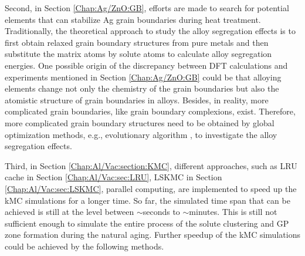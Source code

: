 Second, in Section \ref{Chap:Ag/ZnO:GB}, efforts are made to search for potential elements that can stabilize Ag grain boundaries during heat treatment. Traditionally, the theoretical approach to study the alloy segregation effects is to first obtain relaxed grain boundary structures from pure metals and then substitute the matrix atoms by solute atoms to calculate alloy segregation energies. One possible origin of the discrepancy between DFT calculations and experiments mentioned in Section \ref{Chap:Ag/ZnO:GB} could be that alloying elements change not only the chemistry of the grain boundaries but also the atomistic structure of grain boundaries in alloys. Besides, in reality, more complicated grain boundaries, like grain boundary complexions, exist\cite{cantwell2014grain}. Therefore, more complicated grain boundary structures need to be obtained by global optimization methods, e.g., evolutionary algorithm \cite{yang2020grain}, to investigate the alloy segregation effects.

Third, in Section \ref{Chap:Al/Vac:section:KMC}, different approaches, such as \ac{LRU} cache in Section \ref{Chap:Al/Vac:sec:LRU}, \ac{LSKMC} in Section \ref{Chap:Al/Vac:sec:LSKMC}, parallel computing, are implemented to speed up the \ac{kMC} simulations for a longer time. So far, the simulated time span that can be achieved is still at the level between $\sim$seconds to $\sim$minutes. This is still not sufficient enough to simulate the entire process of the solute clustering and \ac{GP} zone formation during the natural aging. Further speedup of the \ac{kMC} simulations could be achieved by the following methods.

